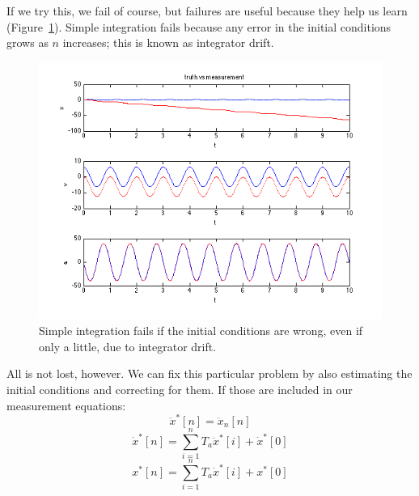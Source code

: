 \documentclass{amsart}
\begin{document}
If we try this, we fail of course, but failures are useful because they help us learn (Figure~\ref{fig:fail1}). Simple integration fails because any error in the initial conditions grows as $n$ increases; this is known as integrator drift.
\begin{figure}
\includegraphics[width=\textwidth]{figures/foo1-uncorr.png}
\caption{Simple integration fails if the initial conditions are wrong, even if only a little, due to integrator drift.}
\label{fig:fail1}
\end{figure}

All is not lost, however.  We can fix this particular problem by also estimating the initial conditions and correcting for them.  If those are included in our measurement equations:
\begin{equation}
\ddot{x}^*[n] = \ddot{x}_n[n]
\end{equation}
\begin{equation}
\dot{x}^*[n] = \sum_{i=1}^n T_a \ddot{x}^*[i] + \dot{x}^*[0]
\end{equation}
\begin{equation}
x^*[n] = \sum_{i=1}^n T_a \dot{x}^*[i] + x^*[0]
\end{equation}
\end{document}

